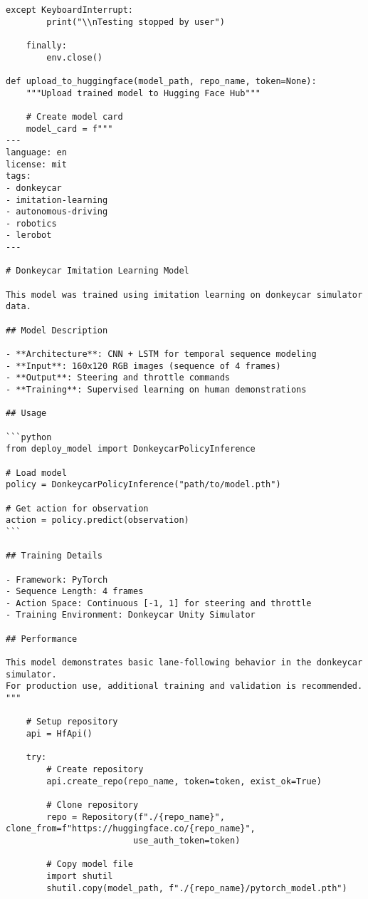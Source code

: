 \documentclass[11pt,a4paper]{article}
\begin{document}
\begin{lstlisting}[style=pythonstyle, caption={Model deployment utilities (deploy\_model.py)}]
    except KeyboardInterrupt:
        print("\\nTesting stopped by user")
    
    finally:
        env.close()

def upload_to_huggingface(model_path, repo_name, token=None):
    """Upload trained model to Hugging Face Hub"""
    
    # Create model card
    model_card = f"""
---
language: en
license: mit
tags:
- donkeycar
- imitation-learning
- autonomous-driving
- robotics
- lerobot
---

# Donkeycar Imitation Learning Model

This model was trained using imitation learning on donkeycar simulator data.

## Model Description

- **Architecture**: CNN + LSTM for temporal sequence modeling
- **Input**: 160x120 RGB images (sequence of 4 frames)
- **Output**: Steering and throttle commands
- **Training**: Supervised learning on human demonstrations

## Usage

```python
from deploy_model import DonkeycarPolicyInference

# Load model
policy = DonkeycarPolicyInference("path/to/model.pth")

# Get action for observation
action = policy.predict(observation)
```

## Training Details

- Framework: PyTorch
- Sequence Length: 4 frames
- Action Space: Continuous [-1, 1] for steering and throttle
- Training Environment: Donkeycar Unity Simulator

## Performance

This model demonstrates basic lane-following behavior in the donkeycar simulator.
For production use, additional training and validation is recommended.
"""
    
    # Setup repository
    api = HfApi()
    
    try:
        # Create repository
        api.create_repo(repo_name, token=token, exist_ok=True)
        
        # Clone repository
        repo = Repository(f"./{repo_name}", clone_from=f"https://huggingface.co/{repo_name}", 
                         use_auth_token=token)
        
        # Copy model file
        import shutil
        shutil.copy(model_path, f"./{repo_name}/pytorch_model.pth")
        

\end{lstlisting}
\end{document}
